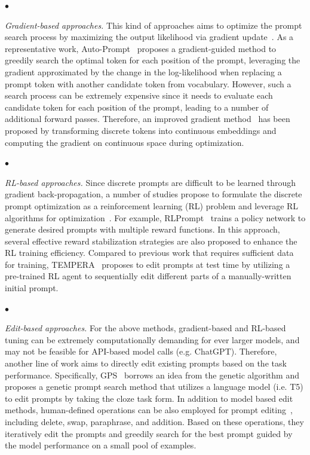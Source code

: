 {{{$\bullet$  {\textit{Gradient-based approaches.} This kind of approaches aims to optimize the prompt search process by maximizing the output likelihood via gradient update~\cite{shin-EMNLP-2020-autoprompt,Wen-CoRR-2023-Hard,Gao-ACL-2021-Making,Zhou-CoRR-2023-InstructZero, Lin-arxiv-2023-Use}. As a representative work, Auto-Prompt~\cite{shin-EMNLP-2020-autoprompt} proposes a gradient-guided method to greedily search the optimal token for each position of the prompt,  leveraging the gradient approximated by the change in the log-likelihood when replacing a prompt token with another candidate token from vocabulary. However, such a search process can be extremely expensive since it needs to evaluate each candidate token for each position of the prompt, leading to a number of additional forward passes. Therefore, an improved gradient method~\cite{Wen-CoRR-2023-Hard} has been proposed by transforming discrete tokens into continuous embeddings and computing the gradient on continuous space during optimization. 

$\bullet$ {\textit{RL-based approaches.} Since discrete prompts are difficult to be learned through gradient back-propagation, a number of studies propose to formulate the discrete prompt optimization as a reinforcement learning (RL) problem and leverage RL algorithms for optimization~\cite{Deng-EMNLP-2022-RLPrompt, Zhang-ICLR-2023-TEMPERA,Jafari-arxiv-2024-MORL,Kong-arxiv-2024-PRewrite}. For example, RLPrompt~\cite{Deng-EMNLP-2022-RLPrompt} {trains a policy network to generate desired prompts with multiple reward functions}. In this approach, several effective reward stabilization strategies are also proposed to enhance the RL training efficiency.  Compared to previous work that requires sufficient data for training, TEMPERA~\cite{Zhang-ICLR-2023-TEMPERA} proposes to edit prompts at test time {by utilizing a pre-trained RL agent to sequentially edit different parts of a manually-written initial prompt. }

$\bullet$  {\textit{Edit-based approaches.} For the above methods, gradient-based and RL-based tuning can be extremely computationally demanding for ever larger models, and may not be feasible for API-based model calls (e.g. ChatGPT). Therefore, another line of work aims to directly edit existing prompts based on the task performance. Specifically, GPS~\cite{Xu-EMNLP-2022-GPS} borrows an idea from the genetic algorithm and proposes a genetic prompt search method that utilizes a language model (i.e. T5) to edit prompts by taking the cloze task form. In addition to model based edit methods, human-defined operations can be also employed for prompt editing~\cite{Prasad-EACL-2023-GrIPS}, including delete, swap, paraphrase, and addition. Based on these operations, they iteratively edit the prompts and greedily search for the best prompt guided by the model performance on a small pool of examples.

}}}}}}
